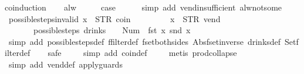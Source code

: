 \begin{isabellebody}
{\isacharparenleft}coinduction{\isacharparenright}\isanewline
\ \ \isamarkupfalse%
\ alw\isanewline
\ \ \isamarkupfalse%
\ \isamarkupfalse%
\ {\isacharquery}case\isanewline
\ \ \ \ \isamarkupfalse%
\ {\isacharparenleft}simp\ add{\isacharcolon}\ vend{\isacharunderscore}insufficient\ alw{\isacharunderscore}not{\isacharunderscore}some{\isacharparenright}\isanewline
{}\isamarkupfalse%
%
\endisatagproof
{\isafoldproof}%
%
\isadelimproof
\isanewline
%
\endisadelimproof
\isanewline
{}\isamarkupfalse%
\ possible{\isacharunderscore}steps{\isacharunderscore}{}{\isacharunderscore}invalid{\isacharcolon}\ {\isachardoublequoteopen}x{}\ {\isasymnoteq}\ {\isacharparenleft}STR\ {\isacharprime}{\isacharprime}coin{\isacharprime}{\isacharprime}{\isacharcomma}\ {\isacharbrackleft}{\isacharbrackright}{\isacharparenright}\ {\isasymLongrightarrow}\isanewline
\ \ \ \ \ \ \ x{}\ {\isasymnoteq}\ {\isacharparenleft}STR\ {\isacharprime}{\isacharprime}vend{\isacharprime}{\isacharprime}{\isacharcomma}\ {\isacharbrackleft}{\isacharbrackright}{\isacharparenright}\ {\isasymLongrightarrow}\isanewline
\ \ \ \ \ \ \ possible{\isacharunderscore}steps\ drinks\ {}\ {\isacharparenleft}{\isacharless}{\isachargreater}{\isacharparenleft}{}\ {\isacharcolon}{\isacharequal}\ Num\ {}{\isacharparenright}{\isacharparenright}\ {\isacharparenleft}fst\ x{}{\isacharparenright}\ {\isacharparenleft}snd\ x{}{\isacharparenright}\ {\isacharequal}\ {\isacharbraceleft}{\isacharbar}{\isacharbar}{\isacharbraceright}{\isachardoublequoteclose}\isanewline
%
\isadelimproof
\ \ %
\endisadelimproof
%
\isatagproof
{}\isamarkupfalse%
\ {\isacharparenleft}simp\ add{\isacharcolon}\ possible{\isacharunderscore}steps{\isacharunderscore}def\ ffilter{\isacharunderscore}def\ fset{\isacharunderscore}both{\isacharunderscore}sides\ Abs{\isacharunderscore}fset{\isacharunderscore}inverse\ drinks{\isacharunderscore}def\ Set{\isachardot}filter{\isacharunderscore}def{\isacharparenright}\isanewline
\ \ \isamarkupfalse%
\ safe\isanewline
\ \ \ \isamarkupfalse%
\ {\isacharparenleft}simp\ add{\isacharcolon}\ coin{\isacharunderscore}def{\isacharparenright}\isanewline
\ \ \ \isamarkupfalse%
\ {\isacharparenleft}metis\ prod{\isachardot}collapse{\isacharparenright}\isanewline
\ \ \isamarkupfalse%
\ {\isacharparenleft}simp\ add{\isacharcolon}\ vend{\isacharunderscore}def\ apply{\isacharunderscore}guards{\isacharparenright}%

\end{isabellebody}
